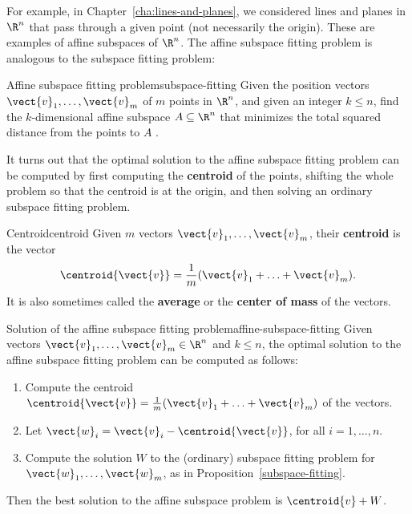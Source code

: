 For example, in Chapter~\ref{cha:lines-and-planes}, we considered
lines and planes in $\R^n$ that pass through a given point (not
necessarily the origin). These are examples of affine subspaces of
$\R^n$. The affine subspace fitting problem is analogous to the
subspace fitting problem:

\begin{problem}{Affine subspace fitting problem}{subspace-fitting}
  Given the position vectors $\vect{v}_1,\ldots,\vect{v}_m$ of $m$
  points in $\R^n$, and given an integer $k\leq n$, find the
  $k$-dimensional affine subspace $A\subseteq\R^n$ that minimizes the
  total squared distance from the points to $A$%
  .
\end{problem}

It turns out that the optimal solution to the affine subspace fitting
problem can be computed by first computing the \textbf{centroid} of
the points, shifting the whole problem so that the centroid is at the
origin, and then solving an ordinary subspace fitting problem.

\begin{definition}{Centroid}{centroid}
  Given $m$ vectors $\vect{v}_1,\ldots,\vect{v}_m$, their
  \textbf{centroid}%
   is the vector
  \begin{equation*}
    \centroid{\vect{v}} = \frac{1}{m}(\vect{v}_1+\ldots+\vect{v}_m).
  \end{equation*}
  It is also sometimes called the \textbf{average}%
   or the \textbf{center of mass}%
   of the vectors.
\end{definition}

\begin{proposition}{Solution of the affine subspace fitting problem}{affine-subspace-fitting}
  Given vectors $\vect{v}_1,\ldots,\vect{v}_m\in\R^n$ and $k\leq n$,
  the optimal solution to the affine subspace fitting problem can be
  computed as follows:
  \begin{enumerate}
    \item Compute the centroid $\centroid{\vect{v}} =
      \frac{1}{m}(\vect{v}_1+\ldots+\vect{v}_m)$ of the vectors.
    \item Let $\vect{w}_i = \vect{v}_i - \centroid{\vect{v}}$, for all
      $i=1,\ldots,n$.
    \item Compute the solution $W$ to the (ordinary) subspace fitting
      problem for $\vect{w}_1,\ldots,\vect{w}_m$, as in
      Proposition~\ref{subspace-fitting}.
  \end{enumerate}
  Then the best solution to the affine subspace problem is
  $\centroid{v} + W$.
\end{proposition}

